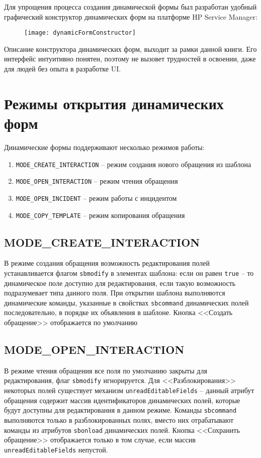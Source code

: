\documentclass[../index.tex]{subfiles}
\begin{document}
Для упрощения процесса создания динамической формы был разработан удобный графический конструктор
динамических форм на платформе HP Service Manager:

\begin{figure}[h]
	\texttt{[image: dynamicFormConstructor]}
	\centering
\end{figure}

Описание конструктора динамических форм, выходит за рамки данной книги.
Его интерфейс интуитивно понятен, поэтому не вызовет трудностей в освоении,
даже для людей без опыта в разработке UI.

\section{Режимы открытия динамических форм}
Динамические формы поддерживают несколько режимов работы:

\begin{enumerate}
	\item \verb|MODE_CREATE_INTERACTION| -- режим создания нового обращения из шаблона
	\item \verb|MODE_OPEN_INTERACTION| -- режим чтения обращения
    \item \verb|MODE_OPEN_INCIDENT| -- режим работы с инцидентом
	\item \verb|MODE_COPY_TEMPLATE| -- режим копирования обращения
\end{enumerate}

\subsection{MODE\_CREATE\_INTERACTION}
В режиме создания обращения возможность редактирования полей устанавливается 
флагом \verb|sbmodify| в элементах шаблона: если он равен \verb|true| -- то динамическое поле доступно для редактирования, если такую возможность подразумевает типа данного поля.
При открытии шаблона выполняются динамические команды, указанные в свойствах  \verb|sbcommand| динамических
полей последовательно, в порядке их объявления в шаблоне. Кнопка <<Создать обращение>> отображается по умолчанию
	
\subsection{MODE\_OPEN\_INTERACTION}
В режиме чтения обращения все поля по умолчанию закрыты для редактирования, флаг \verb|sbmodify| игнорируется.
Для <<Разблокирования>> некоторых полей существует механизм \verb|unreadEditableFields| -- данный атрибут обращения содержит массив идентификаторов динамических полей, которые будут доступны для редактирования в данном режиме. Команды \verb|sbcommand| выполняются только в разблокированных полях, вместо них отрабатывают команды из атрибутов \verb|sbonload| динамических полей. Кнопка <<Сохранить обращение>> отображается только в том случае, если массив \verb|unreadEditableFields| непустой.
\end{document}
